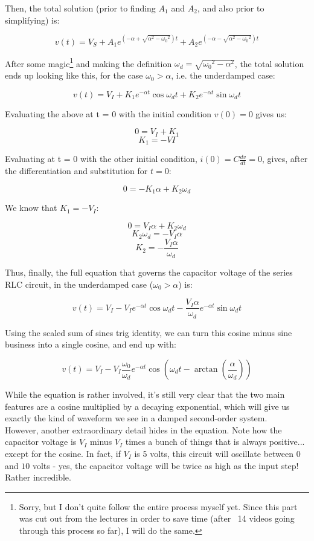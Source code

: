 \documentclass[12pt,a4paper]{report}
\begin{document}
Then, the total solution (prior to finding $A_1$ and $A_2$, and also prior to simplifying) is:

\[ v(t) = V_S + A_1 e^{(-\alpha + \sqrt{\alpha^2 - {\omega_0}^2}) t} + A_2 e^{(-\alpha - \sqrt{\alpha^2 - {\omega_0}^2}) t} \]

After some magic\footnote{Sorry, but I don't quite follow the entire process myself yet. Since this part was cut out from the lectures in order to save time (after ~14 videos going through this process so far), I will do the same.} and making the definition $\omega_d = \sqrt{{\omega_0}^2 - \alpha^2}$, the total solution ends up looking like this, for the case $\omega_0 > \alpha$, i.e. the underdamped case:

\[ v(t) = V_I + K_1 e^{-\alpha t} \cos{\omega_d t} + K_2 e^{-\alpha t} \sin{\omega_d t} \]

Evaluating the above at t = 0 with the initial condition $v(0) = 0$ gives us:

\[ 0 = V_I + K_1 \]
\[ K_1 = -VI \]

Evaluating at t = 0 with the other initial condition, $\displaystyle i(0) = C \frac{dv}{dt} = 0$, gives, after the differentiation and substitution for $t = 0$:

\[ 0 = -K_1 \alpha + K_2 \omega_d \]

We know that $K_1 = -V_I$:

\[ 0 = V_I \alpha + K_2 \omega_d \]
\[ K_2 \omega_d = -V_I \alpha \]
\[ K_2 = -\frac{V_I \alpha}{\omega_d} \]

Thus, finally, the full equation that governs the capacitor voltage of the series RLC circuit, in the underdamped case ($\omega_0 > \alpha$) is:

\[ v(t) = V_I - V_I e^{-\alpha t} \cos{\omega_d t} - \frac{V_I \alpha}{\omega_d} e^{-\alpha t} \sin{\omega_d t} \]

Using the scaled sum of sines trig identity, we can turn this cosine minus sine business into a single cosine, and end up with:

\[ v(t) = V_I - V_I \frac{\omega_0}{\omega_d} e^{-\alpha t} \cos{(\omega_d t - \arctan{(\frac{\alpha}{\omega_d})})} \]

While the equation is rather involved, it's still very clear that the two main features are a cosine multiplied by a decaying exponential, which will give us exactly the kind of waveform we see in a damped second-order system.\\
However, another extraordinary detail hides in the equation. Note how the capacitor voltage is $V_I$ minus $V_I$ times a bunch of things that is always positive... except for the cosine. In fact, if $V_I$ is 5 volts, this circuit will oscillate between 0 and $10$ volts - yes, the capacitor voltage will be twice as high as the input step! Rather incredible.
\end{document}
